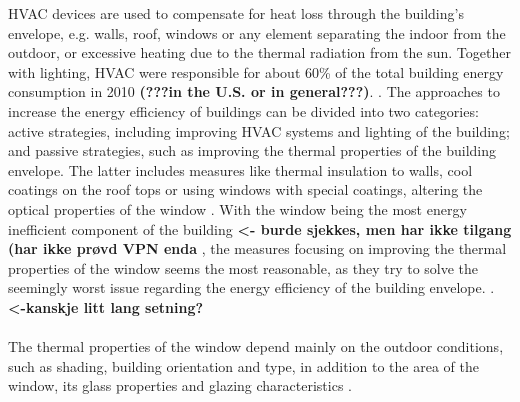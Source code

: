 HVAC devices are used to compensate for heat loss through the building's envelope,
e.g. walls, roof, windows or any element separating the indoor from the outdoor, 
or excessive heating due to the thermal radiation from the sun.
Together with lighting, HVAC were responsible for about 60\% of the total building energy consumption 
in 2010
\textbf{(???in the U.S. or in general???)}.
\cite{buildingsEnergyDatabook}. 
%
The approaches to increase the energy efficiency of buildings can be divided into two 
categories: active strategies, including improving HVAC systems and lighting of the building;
and passive strategies, such as improving the thermal properties of the building envelope. 
The latter includes measures like thermal insulation to walls, cool coatings on the roof tops
or using windows with special coatings, altering the optical properties of the window 
\cite{Bojic2001,Cheung2005,Synnefa2007,Sadineni2011}.
%
With the window being the most energy inefficient component of the building 
\cite{Baetens2010} 
%
\textbf{<- burde sjekkes, men har ikke tilgang (har ikke prøvd VPN enda}
%
, the measures focusing on improving the thermal properties 
of the window seems the most reasonable, as they try to solve the seemingly 
worst issue regarding the energy efficiency of the building envelope. 
\cite{Kamalisarvestani2013}.
%
\textbf{<-kanskje litt lang setning?}
%
\\
\\
The thermal properties of the window depend mainly on
the outdoor conditions, such as shading, building orientation and type, in addition to the
area of the window, its glass properties and glazing characteristics \cite{Hassouneh2010}. 
